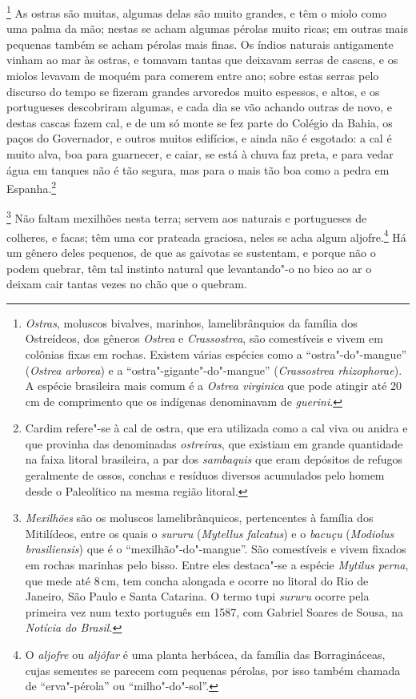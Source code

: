 \footnote{ \textit{Ostras}, moluscos bivalves,
marinhos, lamelibrânquios da família dos Ostreídeos, dos gêneros
\textit{Ostrea} e \textit{Crassostrea}, são comestíveis e vivem em
colônias fixas em rochas. Existem várias espécies como a
``ostra"-do"-mangue'' (\textit{Ostrea arborea}) e a ``ostra"-gigante"-do"-mangue'' 
(\textit{Crassostrea rhizophorae}). A espécie
brasileira mais comum é a \textit{Ostrea virginica} que pode atingir
até 20\,cm de comprimento que os indígenas denominavam de \textit{guerini}.} 
As ostras são muitas, algumas delas são muito grandes,
e têm o miolo como uma palma da mão; nestas se acham algumas pérolas
muito ricas; em outras mais pequenas também se acham pérolas mais
finas. Os índios naturais antigamente vinham ao mar às ostras, e
tomavam tantas que deixavam serras de cascas, e os miolos levavam de
moquém para comerem entre ano; sobre estas serras pelo discurso do
tempo se fizeram grandes arvoredos muito espessos, e altos, e os
portugueses descobriram algumas, e cada dia se vão achando outras de
novo, e destas cascas fazem cal, e de um só monte se fez parte do
Colégio da Bahia, os paços do Governador, e outros muitos edifícios, e
ainda não é esgotado: a cal é muito alva, boa para guarnecer, e caiar,
se está à chuva faz preta, e para vedar água em tanques não é tão
segura, mas para o mais tão boa como a pedra em Espanha.\footnote{ Cardim 
refere"-se à cal de ostra, que era utilizada como a cal viva ou
anidra e que provinha das denominadas \textit{ostreiras}, que existiam
em grande quantidade na faixa litoral brasileira, a par dos
\textit{sambaquis} que eram depósitos de refugos geralmente de ossos,
conchas e resíduos diversos acumulados pelo homem desde o Paleolítico
na mesma região litoral.} 

\footnote{ \textit{Mexilhões} são os moluscos
lamelibrânquicos, pertencentes à família dos Mitilídeos, entre os quais
o \textit{sururu} (\textit{Mytellus falcatus}) e o \textit{bacuçu} (\textit{Modiolus
brasiliensis}) que é o ``mexilhão"-do"-mangue''. São comestíveis e vivem
fixados em rochas marinhas pelo bisso. Entre eles destaca"-se a espécie
\textit{Mytilus perna}, que mede até 8\,cm, tem concha alongada e ocorre
no litoral do Rio de Janeiro, São Paulo e Santa Catarina. O termo tupi
\textit{sururu} ocorre pela primeira vez num texto português em 1587,
com Gabriel Soares de Sousa, na \textit{Notícia do Brasil.}} 
Não faltam mexilhões nesta terra; servem aos naturais e portugueses de
colheres, e facas; têm uma cor prateada graciosa, neles se acha algum
aljofre.\footnote{ O \textit{aljofre} ou \textit{aljôfar} é uma planta
herbácea, da família das Borragináceas, cujas sementes se parecem com
pequenas pérolas, por isso também chamada de ``erva"-pérola'' ou
``milho"-do"-sol''.} Há um gênero deles pequenos, de que as gaivotas se
sustentam, e porque não o podem quebrar, têm tal instinto natural que
levantando"-o no bico ao ar o deixam cair tantas vezes no chão que o quebram. 

